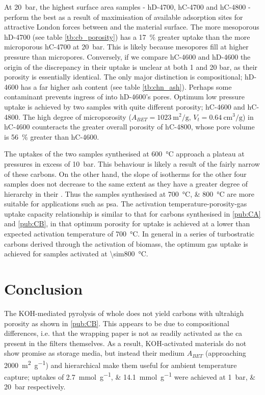 At \qty{20}{\bar}, the highest surface area samples - hD-4700, hC-4700 and hC-4800 - perform the best as a result of maximisation of available adsorption sites for attractive London forces between  and the material surface. The more mesoporous hD-4700 (see table \ref{tb:cb_porosity}) has a \qty{17}{\percent} greater  uptake than the more microporous hC-4700 at \qty{20}{\bar}. This is likely because \glspl{mesopore} fill at higher pressure than \glspl{micropore}. Conversely, if we compare hC-4600 and hD-4600 the origin of the discrepancy in their  uptake is unclear at both 1 and 20 bar, as their porosity is essentially identical. The only major distinction is compositional; hD-4600 has a far higher \gls{ash content} (see table \ref{tb:chn_ash}). Perhaps some contaminant prevents ingress of  into hD-4600's pores. Optimum low pressure  uptake is achieved by two samples with quite different porosity; hC-4600 and hC-4800. The high degree of microporosity ($A_{BET} = \qty{1023}{\metre\squared\per\gram}$, $V_t = \qty{0.64}{\cm\cubed\per\gram}$) in hC-4600 counteracts the greater overall porosity of hC-4800, whose pore volume is \qty{56}{\percent} greater than hC-4600. 

The  uptakes of the two samples synthesised at \qty{600}{\degreeCelsius} approach a plateau at pressures in excess of \qty{10}{\bar}. This behaviour is likely a result of the fairly narrow  of these carbons. On the other hand, the slope of isotherms for the other four samples does not decrease to the same extent as they have a greater degree of hierarchy in their . Thus the samples synthesised at \qtylist[list-units=single]{700;800}{\degreeCelsius} are more suitable for applications such as \acrshort{psa}.\citep{Sevilla2014Energy} The activation temperature-porosity-gas uptake capacity relationship is similar to that for carbons synthesised in \ref{pub:CA} and \ref{pub:CB}, in that optimum porosity for  uptake is achieved at a lower than expected activation temperature of \qty{700}{\degreeCelsius}. In general in a series of \glspl{turbostratic carbon} derived through the activation of biomass, the optimum gas uptake is achieved for samples activated at \qty{\sim800}{\degreeCelsius}.\citep{Ariharan2018}

\section{Conclusion}

The KOH-mediated pyrolysis of whole  does not yield carbons with ultrahigh porosity as shown in \ref{pub:CB}. This appears to be due to compositional differences, i.e. that the wrapping paper is not as readily activated as the \acrshort{ca} present in the filters themselves. As a result, KOH-activated materials do not show promise as  storage media, but instead their medium $A_{BET}$ (approaching \qty{2000}{\metre\squared\per\gram}) and hierarchical  make them useful for ambient temperature  capture;  uptakes of \qtylist[list-units=single]{2.7;14.1}{\milli\mole\per\gram} were achieved at \qtylist[list-units=single]{1;20}{\bar} respectively. 

